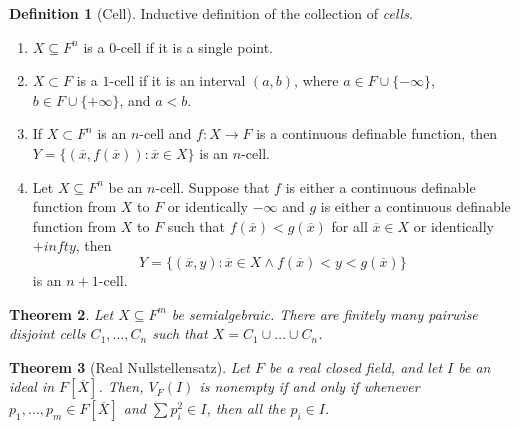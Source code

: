 \documentclass{amsart}
\newtheorem{theorem}{Theorem}[subsection]
\newtheorem{lemma}[theorem]{Lemma}
\theoremstyle{definition}
\newtheorem{definition}[theorem]{Definition}
\numberwithin{equation}{section}
\begin{document}
\begin{definition}[Cell]
  Inductive definition of the collection of \emph{cells}.
  \begin{enumerate}[label = {$\bullet$}]
    \item $X \subseteq F^n$ is a $0$-cell if it is a single point.
    \item $X \subset F$ is a $1$-cell if it is an interval $(a,b)$,
      where $a \in F \cup \{-\infty\}$, $b\in F\cup \{+\infty\}$, and $a < b$.
    \item If $X \subset F^n$ is an $n$-cell and $f: X\to F$ is a continuous definable function,
      then $Y = \{(\overline{x},f(\overline{x})): \overline{x} \in X\}$ is an $n$-cell.
    \item Let $X \subseteq F^n$ be an $n$-cell. Suppose that $f$ is
      either a continuous definable function from $X$ to $F$ or identically $-\infty$ and
      $g$ is either a continuous definable function from $X$ to $F$
      such that $f(\overline{x}) < g(\overline{x})$ for all $\overline{x} \in X$ or identically $+infty$, then
      \[
        Y = \{(\overline{x},y): \overline{x} \in X \land f(\overline{x}) < y < g(\overline{x})\}
      \]
      is an $n+1$-cell.
  \end{enumerate}
\end{definition}


\begin{tcolorbox}[title = {Cell Decomposition}]
\begin{theorem}
  Let $X \subseteq F^m$ be semialgebraic.
  There are finitely many pairwise disjoint cells $C_1,\dots,C_n$ such that $X = C_1 \cup \dots \cup C_n$.
\end{theorem}
\end{tcolorbox}

\begin{theorem}[Real Nullstellensatz]
  Let $F$ be a real closed field,
  and let $I$ be an ideal in $F[\overline{X}]$.
  Then, $V_F(I)$ is nonempty if and only if whenever $p_1,\dots,p_m\in F[\overline{X}]$ and $\sum p_i^2 \in I$,
  then all the $p_i \in I$.
\end{theorem}
\end{document}
